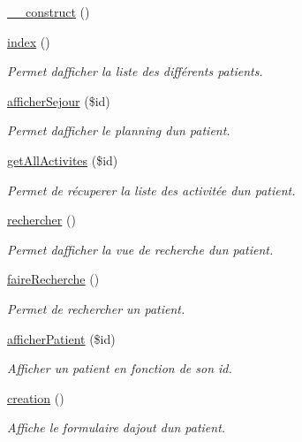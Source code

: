 \begin{DoxyCompactItemize}
\item 
\hyperlink{class_patient_a253a158c107bee31fa35a99ebf9c7328}{\+\_\+\+\_\+construct} ()
\item 
\hyperlink{class_patient_a292b1a3be44804e50a412edc3c282cec}{index} ()
\begin{DoxyCompactList}\small\item\em Permet d\textquotesingle{}afficher la liste des différents patients. \end{DoxyCompactList}\item 
\hyperlink{class_patient_a5714c582c9b7e3afa2109a1633f271b1}{afficher\+Sejour} (\$id)
\begin{DoxyCompactList}\small\item\em Permet d\textquotesingle{}afficher le planning d\textquotesingle{}un patient. \end{DoxyCompactList}\item 
\hyperlink{class_patient_a16ba27b24b5f47f4777a2347637d589b}{get\+All\+Activites} (\$id)
\begin{DoxyCompactList}\small\item\em Permet de récuperer la liste des activitée d\textquotesingle{}un patient. \end{DoxyCompactList}\item 
\hyperlink{class_patient_ad652801d1938a0d4c4b66e04c1c34f17}{rechercher} ()
\begin{DoxyCompactList}\small\item\em Permet d\textquotesingle{}afficher la vue de recherche d\textquotesingle{}un patient. \end{DoxyCompactList}\item 
\hyperlink{class_patient_ac6376a017eb21e63247f4a98b5a98ab2}{faire\+Recherche} ()
\begin{DoxyCompactList}\small\item\em Permet de rechercher un patient. \end{DoxyCompactList}\item 
\hyperlink{class_patient_a4ece101cffc7c5cff730959ee9c9b684}{afficher\+Patient} (\$id)
\begin{DoxyCompactList}\small\item\em Afficher un patient en fonction de son id. \end{DoxyCompactList}\item 
\hyperlink{class_patient_af8fd309485d3f8e985acdf0ce5ab2dcd}{creation} ()
\begin{DoxyCompactList}\small\item\em Affiche le formulaire d\textquotesingle{}ajout d\textquotesingle{}un patient. \end{DoxyCompactList}\item 

\end{DoxyCompactItemize}
